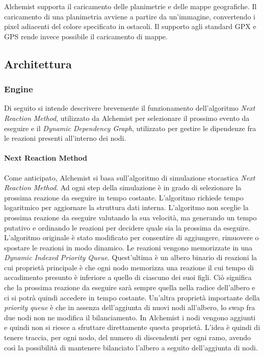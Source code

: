 \documentclass[12pt,a4paper,openright,twoside]{book}
\begin{document}
Alchemist supporta il caricamento delle planimetrie e delle mappe geografiche. Il caricamento di una planimetria avviene a partire da un'immagine, convertendo i pixel adiacenti del colore specificato in ostacoli. Il supporto agli standard GPX e GPS rende invece possibile il caricamento di mappe. 
\subsection{Architettura}
\subsubsection{Engine}
Di seguito si intende descrivere brevemente il funzionamento dell'algoritmo \textit{Next Reaction Method}, utilizzato da Alchemist per selezionare il prossimo evento da eseguire e il \textit{Dynamic Dependency Graph}, utilizzato per gestire le dipendenze fra le reazioni presenti all'interno dei nodi. 
\paragraph{Next Reaction Method}
\label{sec:next-reaction-method}
Come anticipato, Alchemist si basa sull'algoritmo di simulazione stocastica \textit{Next Reaction Method}. Ad ogni step della simulazione è in grado di selezionare la prossima reazione da eseguire in tempo costante. L'algoritmo richiede tempo logaritmico per aggiornare la struttura dati interna. L'algoritmo non sceglie la prossima reazione da eseguire valutando la sua velocità, ma generando un tempo putativo e ordinando le reazioni per decidere quale sia la prossima da eseguire. L'algoritmo originale è stato modificato per consentire di aggiungere, rimuovere o spostare le reazioni in modo dinamico. 
Le reazioni vengono memorizzate in una \textit{Dynamic Indexed Priority Queue}. Quest'ultima è un albero binario di reazioni la cui proprietà principale è che ogni nodo memorizza una reazione il cui tempo di accadimento presunto è inferiore a quello di ciascuno dei suoi figli. Ciò significa che la prossima reazione da eseguire sarà sempre quella nella radice dell'albero e ci si potrà quindi accedere in tempo costante. 
Un'altra proprietà importante della \textit{priority queue} è che in assenza dell'aggiunta di nuovi nodi all'albero, lo swap fra due nodi non ne modifica il bilanciamento. 
In Alchemist i nodi vengono aggiunti e quindi non si riesce a sfruttare direttamente questa proprietà. L'idea è quindi di tenere traccia, per ogni nodo, del numero di discendenti per ogni ramo, avendo così la possibilità di mantenere bilanciato l'albero a seguito dell'aggiunta di nodi. 
\end{document}
